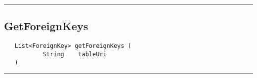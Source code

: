 \rule{15cm}{2pt}
\subsection{GetForeignKeys}
\label{Api:GetForeignKeys}
\begin{verbatim}
   List<ForeignKey> getForeignKeys (
           String    tableUri
   )
\end{verbatim}



\rule{15cm}{2pt}
